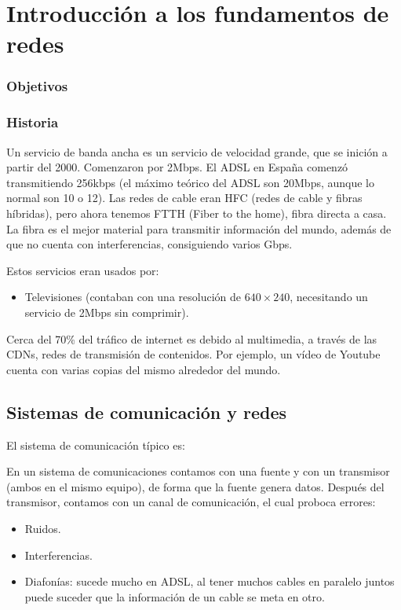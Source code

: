 \chapter{Introducción a los fundamentos de redes}
\subsection{Objetivos}

\subsection{Historia}
Un servicio de banda ancha es un servicio de velocidad grande, que se inición a partir del 2000. Comenzaron por 2Mbps.
El ADSL en España comenzó transmitiendo 256kbps (el máximo teórico del ADSL son 20Mbps, aunque lo normal son 10 o 12).
Las redes de cable eran HFC (redes de cable y fibras híbridas), pero ahora tenemos FTTH (Fiber to the home), fibra directa a casa. La fibra es el mejor material para transmitir información del mundo, además de que no cuenta con interferencias, consiguiendo varios Gbps.

Estos servicios eran usados por:
\begin{itemize}
    \item Televisiones (contaban con una resolución de $640\times 240$, necesitando un servicio de 2Mbps sin comprimir).
\end{itemize}

Cerca del 70\% del tráfico de internet es debido al multimedia, a través de las CDNs, redes de transmisión de contenidos.
Por ejemplo, un vídeo de Youtube cuenta con varias copias del mismo alrededor del mundo.

\section{Sistemas de comunicación y redes}
El sistema de comunicación típico es:

En un sistema de comunicaciones contamos con una fuente y con un transmisor (ambos en el mismo equipo), de forma que la fuente genera datos.
Después del transmisor, contamos con un canal de comunicación, el cual proboca errores:
\begin{itemize}
    \item Ruidos.
    \item Interferencias.
    \item Diafonías: sucede mucho en ADSL, al tener muchos cables en paralelo juntos puede suceder que la información de un cable se meta en otro.
\end{itemize}


